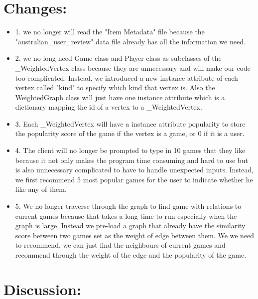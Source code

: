 \documentclass{article}
\begin{document}
\section{Changes:}
    \begin{itemize}
        \item{1.}
            we no longer will read the "Item Metadata" file  because the "australian\_user\_review" data file already has all the information we need.
        \item{2.}
            we no long need Game class and Player class as subclasses of the \_WeightedVertex class because they are unnecessary and will make our code too complicated. Instead, we introduced a new instance attribute of each vertex called "kind" to specify which kind that vertex is. Also the WeightedGraph class will just have one instance attribute which is a dictionary mapping the id of a vertex to a \_WeightedVertex.
        \item{3.}
            Each \_WeightedVertex will have a instance attribute popularity to store the popularity score of the game if the vertex is a game, or 0 if it is a user.
        \item{4.}
            The client will no longer be prompted to type in 10 games that they like because it not only makes the program time consuming and hard to use but is also unnecessary complicated to have to handle unexpected inputs. Instead, we first recommend 5 most popular games for the user to indicate whether he like any of them.
        \item{5.}
            We no longer traverse through the graph to find game with relations to current games because that takes a long time to run especially when the graph is large. Instead we pre-load a graph that already have the similarity score between two games set as the weight of edge between them. We we need to recommend, we can just find the neighbours of current games and recommend through the weight of the edge and the popularity of the game.
    \end{itemize}
\section{Discussion:}
    
\end{document}
